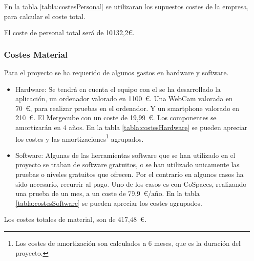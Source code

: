 En la tabla \ref{tabla:costesPersonal} se utilizaran los supuestos costes de la empresa, para calcular el coste total.

El coste de personal total será de 10132,2\euro.


\subsubsection{Costes Material}
Para el proyecto se ha requerido de algunos gastos en hardware y software.

\begin{itemize}
	\item Hardware:
	Se tendrá en cuenta el equipo con el se ha desarrollado la aplicación, un ordenador valorado en 1100~\euro. Una WebCam valorada en 70~\euro, para realizar pruebas en el ordenador. Y un smartphone valorado en 210~\euro. El Mergecube con un coste de 19,99~\euro. Los componentes se amortizarán en 4 años. En la tabla \ref{tabla:costesHardware} se pueden apreciar los costes  y las amortizaciones\footnote{Los costes de amortización son calculados a 6 meses, que es la duración del proyecto.} agrupados.
	\item Software: Algunas de las herramientas software que se han utilizado en el proyecto se traban de software gratuitos, o se han utilizado unicamente las pruebas o niveles gratuitos que ofrecen. Por el contrarío en algunos casos ha sido necesario, recurrir al pago. Uno de los casos es con CoSpaces, realizando una prueba de un mes, a un coste de 79,9~\euro/año. En la tabla \ref{tabla:costesSoftware} se pueden apreciar los costes agrupados.
\end{itemize}



Los costes totales de material, son de 417,48~\euro.



